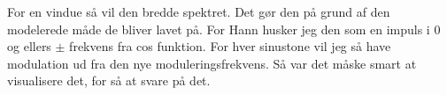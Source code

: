 \begin{EksamensOpgaver}
\begin{Eksamenssæt}
\begin{eksamensOpgave}
\begin{UnderOpgave}
            \end{UnderOpgave}
            \begin{UnderOpgave}
                For en vindue så vil den bredde spektret. Det gør den på grund af den modelerede måde de bliver lavet på. 
                For Hann husker jeg den som en impuls i 0 og ellers $\pm$ frekvens fra cos funktion. 
                For hver sinustone vil jeg så have modulation ud fra den nye moduleringsfrekvens. Så var det måske smart at visualisere det, for så at svare på det. 
            \end{UnderOpgave}
        \end{eksamensOpgave}
    \end{Eksamenssæt}
\end{EksamensOpgaver}






